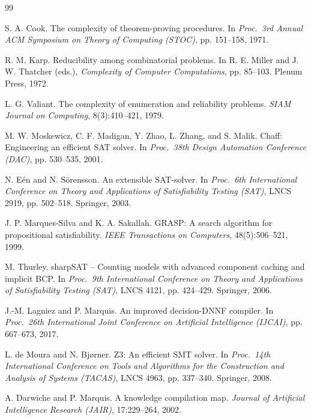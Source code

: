 \documentclass[11pt,a4paper]{report}
\theoremstyle{plain}
\theoremstyle{definition}
\begin{document}
\begin{thebibliography}{99}

  S. A. Cook.
  \newblock The complexity of theorem-proving procedures.
  \newblock In \emph{Proc.\ 3rd Annual ACM Symposium on Theory of Computing (STOC)}, pp. 151--158, 1971.

  R. M. Karp.
  \newblock Reducibility among combinatorial problems.
  \newblock In R. E. Miller and J. W. Thatcher (eds.), \emph{Complexity of Computer Computations}, pp. 85--103. Plenum Press, 1972.

  L. G. Valiant.
  \newblock The complexity of enumeration and reliability problems.
  \newblock \emph{SIAM Journal on Computing}, 8(3):410--421, 1979.

  M. W. Moskewicz, C. F. Madigan, Y. Zhao, L. Zhang, and S. Malik.
  \newblock Chaff: Engineering an efficient SAT solver.
  \newblock In \emph{Proc.\ 38th Design Automation Conference (DAC)}, pp. 530--535, 2001.

  N. Eén and N. Sörensson.
  \newblock An extensible SAT-solver.
  \newblock In \emph{Proc.\ 6th International Conference on Theory and Applications of Satisfiability Testing (SAT)}, LNCS 2919, pp. 502--518. Springer, 2003.

  J. P. Marques-Silva and K. A. Sakallah.
  \newblock GRASP: A search algorithm for propositional satisfiability.
  \newblock \emph{IEEE Transactions on Computers}, 48(5):506--521, 1999.

  M. Thurley.
  \newblock sharpSAT -- Counting models with advanced component caching and implicit BCP.
  \newblock In \emph{Proc.\ 9th International Conference on Theory and Applications of Satisfiability Testing (SAT)}, LNCS 4121, pp. 424--429. Springer, 2006.

  J.-M. Lagniez and P. Marquis.
  \newblock An improved decision-DNNF compiler.
  \newblock In \emph{Proc.\ 26th International Joint Conference on Artificial Intelligence (IJCAI)}, pp. 667--673, 2017.

  L. de Moura and N. Bjørner.
  \newblock Z3: An efficient SMT solver.
  \newblock In \emph{Proc.\ 14th International Conference on Tools and Algorithms for the Construction and Analysis of Systems (TACAS)}, LNCS 4963, pp. 337--340. Springer, 2008.

  A. Darwiche and P. Marquis.
  \newblock A knowledge compilation map.
  \newblock \emph{Journal of Artificial Intelligence Research (JAIR)}, 17:229--264, 2002.


\end{thebibliography}
\end{document}
